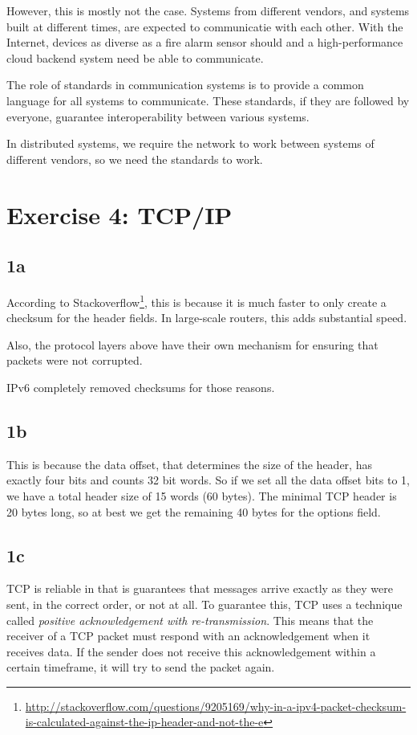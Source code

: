 \documentclass[a4paper]{article}
\begin{document}
However, this is mostly not the case. Systems from different vendors, and systems built at different times, are expected to communicatie with each other. With the Internet, devices as diverse as a fire alarm sensor should and a high-performance cloud backend system need be able to communicate.

The role of standards in communication systems is to provide a common language for all systems to communicate. These standards, if they are followed by everyone, guarantee interoperability between various systems.

In distributed systems, we require the network to work between systems of different vendors, so we need the standards to work.

\section{Exercise 4: TCP/IP}

\subsection{1a}

According to Stackoverflow\footnote{\url{http://stackoverflow.com/questions/9205169/why-in-a-ipv4-packet-checksum-is-calculated-against-the-ip-header-and-not-the-e}}, this is because it is much faster to only create a checksum for the header fields. In large-scale routers, this adds substantial speed.

Also, the protocol layers above have their own mechanism for ensuring that packets were not corrupted. 

IPv6 completely removed checksums for those reasons.

\subsection{1b}

This is because the data offset, that determines the size of the header, has exactly four bits and counts 32 bit words. So if we set all the data offset bits to 1, we have a total header size of 15 words (60 bytes). The minimal TCP header is 20 bytes long, so at best we get the remaining 40 bytes for the options field.

\subsection{1c}

TCP is reliable in that is guarantees that messages arrive exactly as they were sent, in the correct order, or not at all. To guarantee this, TCP uses a technique called \textit{positive acknowledgement with re-transmission}. This means that the receiver of a TCP packet must respond with an acknowledgement when it receives data. If the sender does not receive this acknowledgement within a certain timeframe, it will try to send the packet again.
\end{document}
